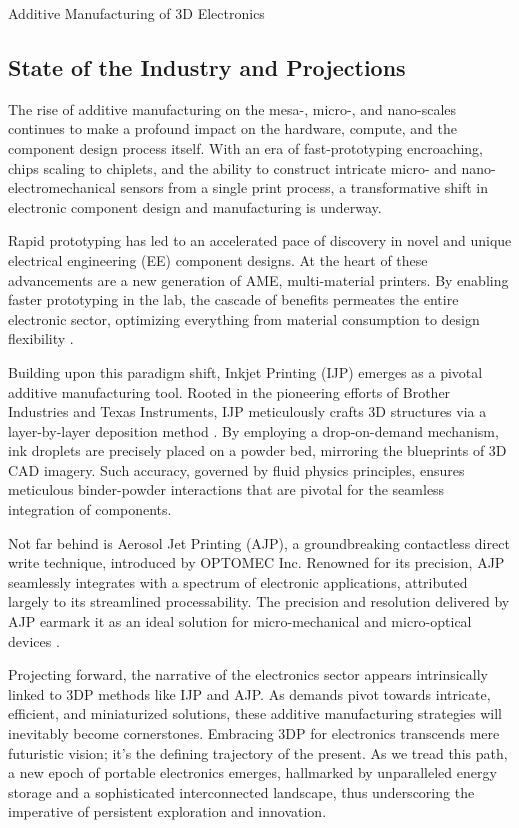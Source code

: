 \documentclass[12pt]{article}
\begin{document}
\begin{section} {Additive Manufacturing of 3D Electronics}

\subsection{State of the Industry and Projections}

The rise of additive manufacturing on the mesa-, micro-, and nano-scales continues to make a profound impact on the hardware, compute, and the component design process itself. With an era of fast-prototyping encroaching, chips scaling to chiplets, and the ability to construct intricate micro- and nano-electromechanical sensors from a single print process, a transformative shift in electronic component design and manufacturing is underway.

Rapid prototyping has led to an accelerated pace of discovery in novel and unique electrical engineering (EE) component designs. At the heart of these advancements are a new generation of AME, multi-material printers. By enabling faster prototyping in the lab, the cascade of benefits permeates the entire electronic sector, optimizing everything from material consumption to design flexibility \cite{divakaran_comprehensive_2022}.

Building upon this paradigm shift, Inkjet Printing (IJP) emerges as a pivotal additive manufacturing tool. Rooted in the pioneering efforts of Brother Industries and Texas Instruments, IJP meticulously crafts 3D structures via a layer-by-layer deposition method \cite{divakaran_comprehensive_2022}. By employing a drop-on-demand mechanism, ink droplets are precisely placed on a powder bed, mirroring the blueprints of 3D CAD imagery. Such accuracy, governed by fluid physics principles, ensures meticulous binder-powder interactions that are pivotal for the seamless integration of components.

Not far behind is Aerosol Jet Printing (AJP), a groundbreaking contactless direct write technique, introduced by OPTOMEC Inc. Renowned for its precision, AJP seamlessly integrates with a spectrum of electronic applications, attributed largely to its streamlined processability. The precision and resolution delivered by AJP earmark it as an ideal solution for micro-mechanical and micro-optical devices \cite{ponis_systematic_2021}.

Projecting forward, the narrative of the electronics sector appears intrinsically linked to 3DP methods like IJP and AJP. As demands pivot towards intricate, efficient, and miniaturized solutions, these additive manufacturing strategies will inevitably become cornerstones. Embracing 3DP for electronics transcends mere futuristic vision; it's the defining trajectory of the present. As we tread this path, a new epoch of portable electronics emerges, hallmarked by unparalleled energy storage and a sophisticated interconnected landscape, thus underscoring the imperative of persistent exploration and innovation. 


\end{section}
\end{document}
